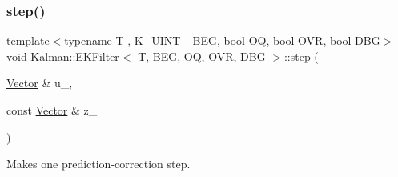 \subsubsection{\texorpdfstring{step()}{step()}}
{\footnotesize\ttfamily template$<$typename T , K\+\_\+\+U\+I\+N\+T\+\_ B\+EG, bool OQ, bool O\+VR, bool D\+BG$>$ \\
void \mbox{\hyperlink{classKalman_1_1EKFilter}{Kalman\+::\+E\+K\+Filter}}$<$ T, B\+EG, OQ, O\+VR, D\+BG $>$\+::step (\begin{DoxyParamCaption}\item[{\mbox{\hyperlink{classKalman_1_1EKFilter_af773d1217ecb01925b857d49b32bc636}{Vector}} \&}]{u\+\_\+,  }\item[{const \mbox{\hyperlink{classKalman_1_1EKFilter_af773d1217ecb01925b857d49b32bc636}{Vector}} \&}]{z\+\_\+ }\end{DoxyParamCaption})}



Makes one prediction-\/correction step. 

